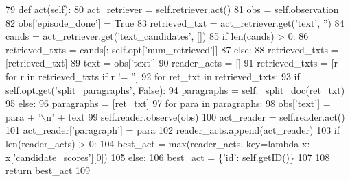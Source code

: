\begin{DoxyCode}
79     \textcolor{keyword}{def }act(self):
80         act\_retriever = self.retriever.act()
81         obs = self.observation
82         obs[\textcolor{stringliteral}{'episode\_done'}] = \textcolor{keyword}{True}
83         retrieved\_txt = act\_retriever.get(\textcolor{stringliteral}{'text'}, \textcolor{stringliteral}{''})
84         cands = act\_retriever.get(\textcolor{stringliteral}{'text\_candidates'}, [])
85         \textcolor{keywordflow}{if} len(cands) > 0:
86             retrieved\_txts = cands[: self.opt[\textcolor{stringliteral}{'num\_retrieved'}]]
87         \textcolor{keywordflow}{else}:
88             retrieved\_txts = [retrieved\_txt]
89         text = obs[\textcolor{stringliteral}{'text'}]
90         reader\_acts = []
91         retrieved\_txts = [r \textcolor{keywordflow}{for} r \textcolor{keywordflow}{in} retrieved\_txts \textcolor{keywordflow}{if} r != \textcolor{stringliteral}{''}]
92         \textcolor{keywordflow}{for} ret\_txt \textcolor{keywordflow}{in} retrieved\_txts:
93             \textcolor{keywordflow}{if} self.opt.get(\textcolor{stringliteral}{'split\_paragraphs'}, \textcolor{keyword}{False}):
94                 paragraphs = self.\_split\_doc(ret\_txt)
95             \textcolor{keywordflow}{else}:
96                 paragraphs = [ret\_txt]
97             \textcolor{keywordflow}{for} para \textcolor{keywordflow}{in} paragraphs:
98                 obs[\textcolor{stringliteral}{'text'}] = para + \textcolor{stringliteral}{'\(\backslash\)n'} + text
99                 self.reader.observe(obs)
100                 act\_reader = self.reader.act()
101                 act\_reader[\textcolor{stringliteral}{'paragraph'}] = para
102                 reader\_acts.append(act\_reader)
103         \textcolor{keywordflow}{if} len(reader\_acts) > 0:
104             best\_act = max(reader\_acts, key=\textcolor{keyword}{lambda} x: x[\textcolor{stringliteral}{'candidate\_scores'}][0])
105         \textcolor{keywordflow}{else}:
106             best\_act = \{\textcolor{stringliteral}{'id'}: self.getID()\}
107 
108         \textcolor{keywordflow}{return} best\_act
109 \end{DoxyCode}
\mbox{\label{classparlai_1_1agents_1_1retriever__reader_1_1retriever__reader_1_1RetrieverReaderAgent_aa2c30c066bf3cf8413fd7fbc4d7de0e1}} 
